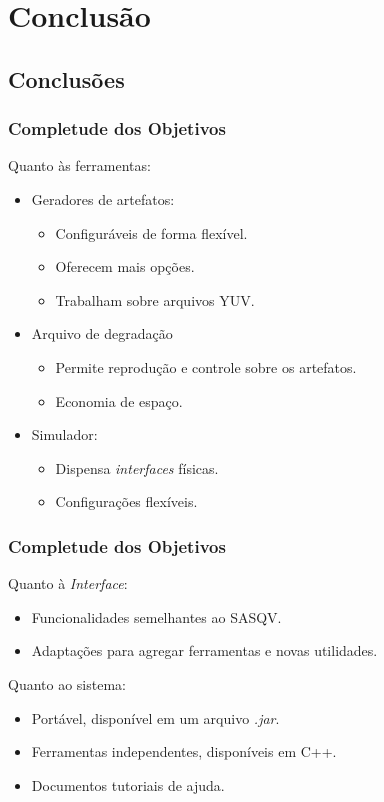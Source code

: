 \section{Conclusão}

\subsection{Conclusões}
    \begin{frame}\frametitle{Completude dos Objetivos}
	Quanto às ferramentas:
	\begin{itemize}
		\item Geradores de artefatos:
		\begin{itemize}
			\item Configuráveis de forma flexível.
			\item Oferecem mais opções.
			\item Trabalham sobre arquivos YUV.
		\end{itemize}
		\item{Arquivo de degradação}
		\begin{itemize}
			\item Permite reprodução e controle sobre os artefatos.
			\item Economia de espaço.
		\end{itemize}
		\item Simulador:
		\begin{itemize}
			\item Dispensa \emph{interfaces} físicas.
			\item Configurações flexíveis.
		\end{itemize}
	\end{itemize}
    \end{frame}

	\begin{frame}\frametitle{Completude dos Objetivos}
	Quanto à \emph{Interface}:
	\begin{itemize}
		\item Funcionalidades semelhantes ao SASQV.
		\item Adaptações para agregar ferramentas e novas utilidades.
	\end{itemize}
	Quanto ao sistema:
	\begin{itemize}
		\item Portável, disponível em um arquivo \emph{.jar}.
		\item Ferramentas independentes, disponíveis em C++.
		\item Documentos tutoriais de ajuda. %
	\end{itemize}
	\end{frame}
    
